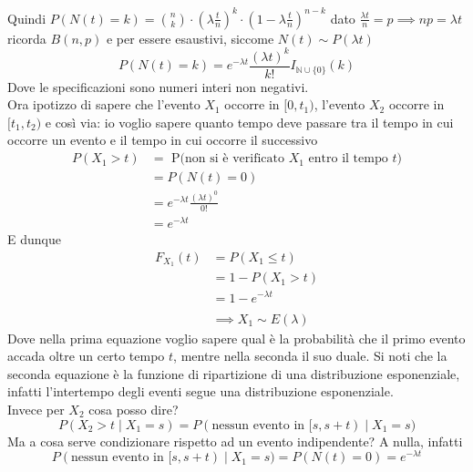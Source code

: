 \documentclass[11pt]{report}
\begin{document}
Quindi $P(N(t)=k) = \binom{n}{k} \cdot \left( \lambda \frac{t}{n} \right)^k \cdot \left( 1 - \lambda \frac{t}{n} \right)^{n-k}$ dato $\frac{\lambda t}{n} = p \implies np = \lambda t$ ricorda $B(n,p)$ e per essere esaustivi, siccome $N(t) \sim P(\lambda t)$
\begin{equation}
	P(N(t)=k) = e^{-\lambda t} \frac{(\lambda t)^k}{k!} I_{\mathbb{N} \cup \{0\}}(k)
\end{equation}
Dove le specificazioni sono numeri interi non negativi.\\
Ora ipotizzo di sapere che l'evento $X_1$ occorre in $[0,t_1)$, l'evento $X_2$ occorre in $[t_1, t_2)$ e così via: io voglio sapere quanto tempo deve passare tra il tempo in cui occorre un evento e il tempo in cui occorre il successivo
\begin{equation}
    \begin{split}
        P(X_1 > t) & = \text{ P(non si è verificato } X_1 \text{ entro il tempo } t \text{)}\\
        & = P(N(t)=0)\\
        & = e^{-\lambda t} \frac{(\lambda t)^0}{0!}\\
        & = e^{-\lambda t}
    \end{split}
\end{equation}
E dunque
\begin{equation}
    \begin{split}
        F_{X_1}(t) & = P(X_1 \leq t)\\
        & = 1 - P(X_1 > t)\\
        & = 1 - e^{-\lambda t}\\
        \\
        & \implies X_1 \sim E(\lambda)
    \end{split}
\end{equation}
Dove nella prima equazione voglio sapere qual è la probabilità che il primo evento accada oltre un certo tempo $t$, mentre nella seconda il suo duale. Si noti che la seconda equazione è la funzione di ripartizione di una distribuzione esponenziale, infatti l'intertempo degli eventi segue una distribuzione esponenziale.\\
Invece per $X_2$ cosa posso dire?
\begin{equation}
	P(X_2 > t \mid X_1 = s) = P(\text{nessun evento in } [s, s+t) \mid X_1 = s)
\end{equation}
Ma a cosa serve condizionare rispetto ad un evento indipendente? A nulla, infatti
\begin{equation}
	P(\text{nessun evento in } [s, s+t) \mid X_1 = s) = P(N(t)=0) = e^{-\lambda t}
\end{equation}
\end{document}
